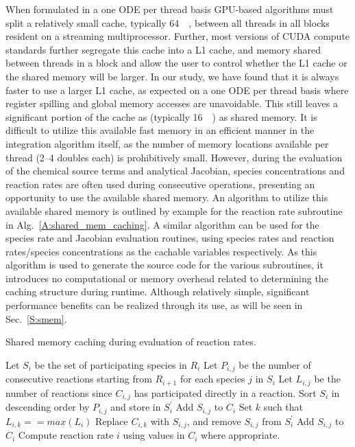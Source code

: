 \documentclass[preprint]{elsarticle}
\begin{document}
When formulated in a one ODE per thread basis GPU-based algorithms must split a relatively small cache, typically \SI{64}{\kilo\byte}, between all threads in all blocks resident on a streaming multiprocessor.
Further, most versions of CUDA compute standards further segregate this cache into a L1 cache, and memory shared between threads in a block and allow the user to control whether the L1 cache or the shared memory will be larger.
In our study, we have found that it is always faster to use a larger L1 cache, as expected on a one ODE per thread basis where register spilling and global memory accesses are unavoidable.
This still leaves a significant portion of the cache as (typically \SI{16}{\kilo\byte}) as shared memory.
It is difficult to utilize this available fast memory in an efficient manner in the integration algorithm itself, as the number of memory locations available per thread (2--4 doubles each) is prohibitively small.
However, during the evaluation of the chemical source terms and analytical Jacobian, species concentrations and reaction rates are often used during consecutive operations, presenting an opportunity to use the available shared memory.
An algorithm to utilize this available shared memory is outlined by example for the reaction rate subroutine in Alg.~\ref{A:shared_mem_caching}.
A similar algorithm can be used for the species rate and Jacobian evaluation routines, using species rates and reaction rates\slash species concentrations as the cachable variables respectively.
As this algorithm is used to generate the source code for the various subroutines, it introduces no computational or memory overhead related to determining the caching structure during runtime.
Although relatively simple, significant performance benefits can be realized through its use, as will be seen in Sec.~\ref{S:smem}.

\begin{algorithm}
\caption{Shared memory caching during evaluation of reaction rates.}
\begin{algorithmic}[0]
    \State Let $S_i$ be the set of participating species in $R_i$
    \State Let $P_{i,j}$ be the number of consecutive reactions starting from $R_{i + 1}$ for each species $j$ in $S_i$
    \State Let $L_{i,j}$ be the number of reactions since $C_{i,j}$ has participated directly in a reaction.
    \State Sort $S_{i}$ in descending order by $P_{i,j}$ and store in $S_{i}^{\prime}$
	\State Add $S_{i,j}$ to $C_i$
	  \State Set $k$ such that $L_{i,k} == max\left(L_{i}\right)$
	  \State Replace $C_{i,k}$ with $S_{i,j}$, and remove $S_{i,j}$ from $S_{i}^{\prime}$
      \EndIf
    \EndFor
	\State Add $S_{i,j}$ to $C_i$
      \EndIf
    \EndFor
    \State Compute reaction rate $i$ using values in $C_i$ where appropriate.
  \EndFor
\end{algorithmic}
\label{A:shared_mem_caching}
\end{algorithm}
\end{document}
